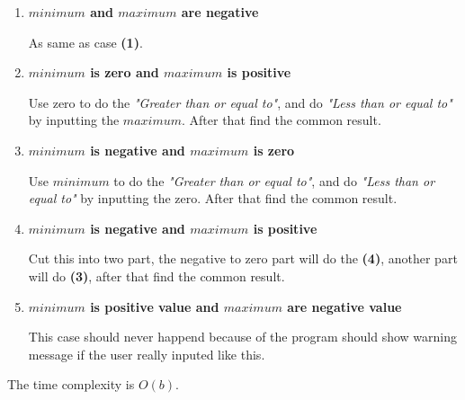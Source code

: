 \begin{enumerate}
\begin{description}
\begin{enumerate}[label=\bfseries (\arabic*)]
\item \textbf{$minimum$ and $maximum$ are negative}

As same as case \textbf{(1)}.

\item \textbf{$minimum$ is zero and $maximum$ is positive}

Use zero to do the \emph{"Greater than or equal to"}, and do \emph{"Less than or equal to"} by inputting the $maximum$. After that find the common result.

\item \textbf{$minimum$ is negative and $maximum$ is zero}

Use $minimum$ to do the \emph{"Greater than or equal to"}, and do \emph{"Less than or equal to"} by inputting the zero. After that find the common result.

\item \textbf{$minimum$ is negative and $maximum$ is positive}

Cut this into two part, the negative to zero part will do the \textbf{(4)}, another part will do \textbf{(3)}, after that find the common result.

\item \textbf{$minimum$ is positive value and $maximum$ are negative value}

This case should never happend because of the program should show warning message if the user really inputed like this.

\end{enumerate}

The time complexity is $O(b)$.

\end{description}

\end{enumerate}

